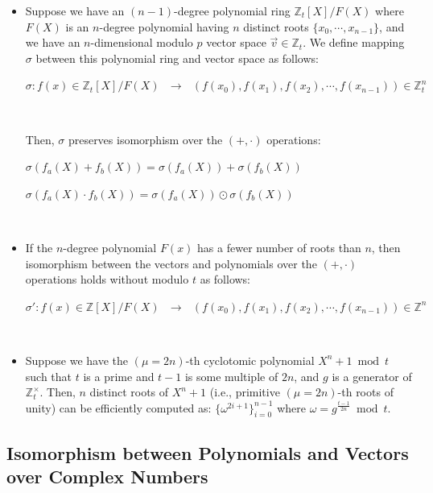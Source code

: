 \begin{tcolorbox}[title={\textbf{\tboxtheorem{\ref*{subsec:polynomial-ring-basis}} Isomorphism between Polynomials and Vectors over Integer (Ring)}}]

\begin{itemize}
\item Suppose we have an $(n-1)$-degree polynomial ring $\mathbb{Z}_t[X] / F(X)$ where $F(X)$ is an $n$-degree polynomial having $n$ distinct roots $\{x_0, \cdots, x_{n-1}\}$, and we have an $n$-dimensional modulo $p$ vector space $\vec{v} \in \mathbb{Z}_t$. We define mapping $\sigma$ between this polynomial ring and vector space as follows:

$\sigma: f(x) \in \mathbb{Z}_t[X] / F(X) \text{ } \longrightarrow \text{ } (f(x_0), f(x_1), f(x_2), \cdots, f(x_{n-1})) \in \mathbb{Z}_t^n$

$ $

Then, $\sigma$ preserves isomorphism over the $(+, \cdot)$ operations:


$\sigma(f_a(X) + f_b(X)) = \sigma(f_a(X)) + \sigma(f_b(X))$

$\sigma(f_a(X) \cdot f_b(X)) = \sigma(f_a(X)) \odot \sigma(f_b(X))$

$ $

\item If the $n$-degree polynomial $F(x)$ has a fewer number of roots than $n$, then isomorphism between the vectors and polynomials over the $(+, \cdot)$ operations holds without modulo $t$ as follows:

$\sigma': f(x) \in \mathbb{Z}[X] / F(X) \text{ } \longrightarrow \text{ } (f(x_0), f(x_1), f(x_2), \cdots, f(x_{n-1})) \in \mathbb{Z}^n$

$ $

\item Suppose we have the $(\mu=2n)$-th cyclotomic polynomial $X^n + 1 \bmod t$ such that $t$ is a prime and $t - 1$ is some multiple of $2n$, and $g$ is a generator of $\mathbb{Z}_t^{\times}$. Then, $n$ distinct roots of $X^n + 1$ (i.e., primitive $(\mu=2n)$-th roots of unity) can be efficiently computed as: $\{\omega^{2i + 1}\}_{i=0}^{n-1}$ where $\omega = g^{\frac{t-1}{2n}} \bmod t$. 


\end{itemize}
\end{tcolorbox}





\subsection{Isomorphism between Polynomials and Vectors over Complex Numbers}
\label{subsec:poly-vector-transformation-complex}


